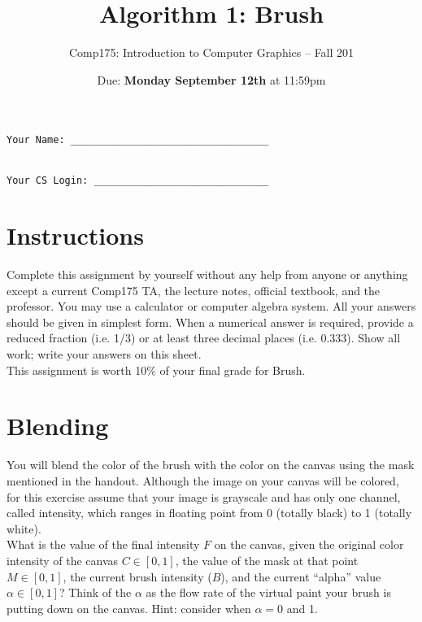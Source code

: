 \documentclass[10pt,twocolumn]{article}
\title{\Huge{\bf Algorithm 1: Brush}}
\author{Comp175: Introduction to Computer Graphics -- Fall 201}
\date{Due:  {\bf Monday September 12th} at 11:59pm}                                           %
\begin{document}
\maketitle

\begin{verbatim}
Your Name: __________________________________


Your CS Login: ______________________________\end{verbatim}

\section{Instructions}
Complete this assignment by yourself without any help from anyone or anything except a
current Comp175 TA, the lecture notes, official textbook, and the professor. You may use a
calculator or computer algebra system. All your answers should be given in simplest form.
When a numerical answer is required, provide a reduced fraction (i.e. 1/3) or at least three
decimal places (i.e. 0.333). Show all work; write your answers on this sheet.\\

This assignment is worth 10\% of your final grade for Brush.

\section{Blending}
You will blend the color of the brush with the color on the canvas using the mask mentioned
in the handout. Although the image on your canvas will be colored, for this exercise assume
that your image is grayscale and has only one channel, called intensity, which ranges in
floating point from 0 (totally black) to 1 (totally white).\\

What is the value of the final intensity $F$ on the canvas, given the original color intensity of
the canvas $C \in [0,1]$, the value of the mask at that point $M \in [0,1]$, the current brush
intensity ($B$), and the current ``alpha'' value $\alpha \in [0,1]$? Think of the $\alpha$ as the flow rate of the virtual paint your brush is putting down on the canvas. Hint: consider when $\alpha = 0$ and 1.
\end{document}
